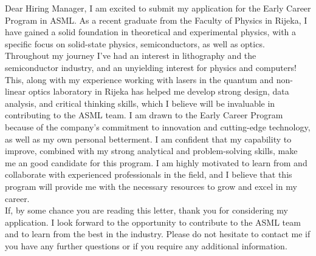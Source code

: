 Dear Hiring Manager,
I am excited to submit my application for the Early Career Program in ASML.
As a recent graduate from the Faculty of Physics in Rijeka, I have gained a solid foundation in theoretical and experimental physics,
with a specific focus on solid-state physics, semiconductors, as well as optics.
Throughout my journey I've had an interest in lithography and the semiconductor industry, and an unyielding interest for physics and computers!
This, along with my experience working with lasers in the quantum and non-linear optics laboratory in Rijeka
has helped me develop strong design, data analysis, and critical thinking skills, which I believe will be invaluable in contributing to the ASML team.
I am drawn to the Early Career Program because of the company's commitment to innovation and cutting-edge technology, as well as my own personal betterment. 
I am confident that my capability to improve, combined with my strong analytical and problem-solving skills, make me an good candidate for this program. 
I am highly motivated to learn from and collaborate with experienced professionals in the field, and I believe that this program will provide me with the necessary resources to grow and excel in my career.\\

If, by some chance you are reading this letter, thank you for considering my application. I look forward to the opportunity to contribute to the ASML team and to learn from the best in the industry.
Please do not hesitate to contact me if you have any further questions or if you require any additional information.
